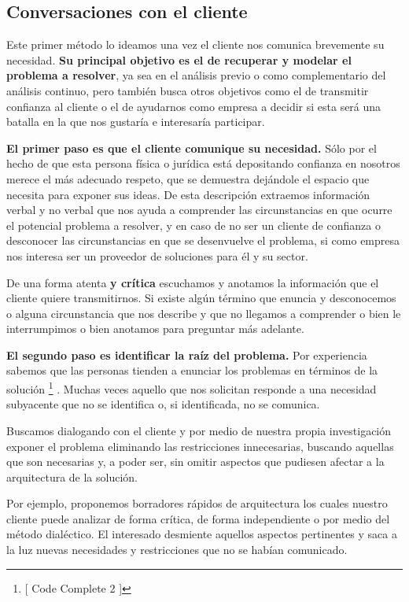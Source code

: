 \subsection{Conversaciones con el cliente}

Este primer método lo ideamos una vez el cliente nos comunica brevemente su necesidad.
\textbf{Su principal objetivo es el de recuperar y modelar el problema a resolver}, ya sea en
el análisis previo o como complementario del análisis continuo, pero también busca
otros objetivos como el de transmitir confianza al cliente o el de ayudarnos como empresa a
decidir si esta será una batalla en la que nos gustaría e interesaría participar.

\textbf{El primer paso es que el cliente comunique su necesidad.} Sólo por el hecho de que esta
persona física o jurídica está depositando confianza en nosotros merece el más
adecuado respeto, que se demuestra dejándole el espacio que necesita para exponer
sus ideas. De esta descripción extraemos información verbal y
no verbal que nos ayuda a comprender las circunstancias en que ocurre el potencial
problema a resolver, y en caso de no ser un cliente de confianza o desconocer las
circunstancias en que se desenvuelve el problema, si como empresa nos interesa
ser un proveedor de soluciones para él y su sector.

De una forma atenta \textbf{y crítica} escuchamos y anotamos la información que el
cliente quiere transmitirnos. Si existe algún término que enuncia y desconocemos
o alguna circunstancia que nos describe y que no llegamos a comprender o bien le
interrumpimos o bien anotamos para preguntar más adelante.

\textbf{El segundo paso es identificar la raíz del problema.} Por experiencia sabemos
que las personas tienden a enunciar los problemas en términos de la solución%
%
\footnote{[ Code Complete 2 ]
}%
. Muchas veces aquello que nos solicitan responde a una necesidad subyacente que no
se identifica o, si identificada, no se comunica.

Buscamos dialogando con el cliente y por medio de nuestra propia investigación exponer
el problema eliminando las restricciones innecesarias, buscando aquellas que son
necesarias y, a poder ser, sin omitir aspectos que pudiesen afectar a la arquitectura
de la solución.

Por ejemplo, proponemos borradores rápidos de arquitectura los cuales
nuestro cliente puede analizar de forma crítica, de forma independiente
o por medio del método dialéctico. El interesado desmiente aquellos aspectos
pertinentes y saca a la luz nuevas necesidades y restricciones que no se habían
comunicado.

